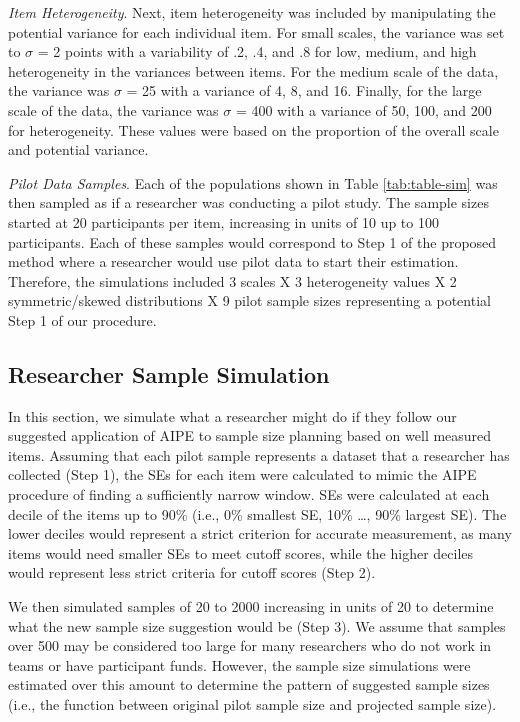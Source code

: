 \documentclass[
  man]{apa7}
\begin{document}
\emph{Item Heterogeneity}. Next, item heterogeneity was included by manipulating the potential variance for each individual item. For small scales, the variance was set to \(\sigma\) = 2 points with a variability of .2, .4, and .8 for low, medium, and high heterogeneity in the variances between items. For the medium scale of the data, the variance was \(\sigma\) = 25 with a variance of 4, 8, and 16. Finally, for the large scale of the data, the variance was \(\sigma\) = 400 with a variance of 50, 100, and 200 for heterogeneity. These values were based on the proportion of the overall scale and potential variance.

\emph{Pilot Data Samples}. Each of the populations shown in Table \ref{tab:table-sim} was then sampled as if a researcher was conducting a pilot study. The sample sizes started at 20 participants per item, increasing in units of 10 up to 100 participants. Each of these samples would correspond to Step 1 of the proposed method where a researcher would use pilot data to start their estimation. Therefore, the simulations included 3 scales X 3 heterogeneity values X 2 symmetric/skewed distributions X 9 pilot sample sizes representing a potential Step 1 of our procedure.

\subsection{Researcher Sample Simulation}\label{researcher-sample-simulation}

In this section, we simulate what a researcher might do if they follow our suggested application of AIPE to sample size planning based on well measured items. Assuming that each pilot sample represents a dataset that a researcher has collected (Step 1), the SEs for each item were calculated to mimic the AIPE procedure of finding a sufficiently narrow window. SEs were calculated at each decile of the items up to 90\% (i.e., 0\% smallest SE, 10\% \ldots, 90\% largest SE). The lower deciles would represent a strict criterion for accurate measurement, as many items would need smaller SEs to meet cutoff scores, while the higher deciles would represent less strict criteria for cutoff scores (Step 2).

We then simulated samples of 20 to 2000 increasing in units of 20 to determine what the new sample size suggestion would be (Step 3). We assume that samples over 500 may be considered too large for many researchers who do not work in teams or have participant funds. However, the sample size simulations were estimated over this amount to determine the pattern of suggested sample sizes (i.e., the function between original pilot sample size and projected sample size).
\end{document}
